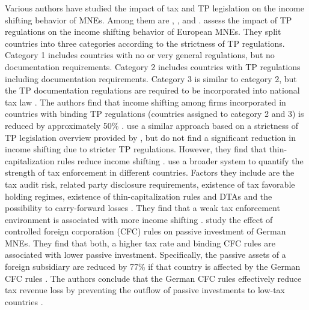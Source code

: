 \documentclass[10pt,twocolumn,oneside,cmyk]{article}
\begin{document}
Various authors have studied the impact of tax and TP legislation on the income shifting behavior of MNEs. Among them are \textcite{lohse_impact_2012}, \textcite{buettner_anti_2017}, \textcite{beuselinck_cross-jurisdictional_2015} and \textcite{ruf_taxation_2012}. \textcite{lohse_impact_2012} assess the impact of TP regulations on the income shifting behavior of European MNEs. They split countries into three categories according to the strictness of TP regulations. Category 1 includes countries with no or very general regulations, but no documentation requirements. Category 2 includes countries with TP regulations including documentation requirements. Category 3 is similar to category 2, but the TP documentation regulations are required to be incorporated into national tax law \parencite[6-7, 19-20]{lohse_impact_2012}. The authors find that income shifting among firms incorporated in countries with binding TP regulations (countries assigned to category 2 and 3) is reduced by approximately 50\% \parencite[10-11]{lohse_impact_2012}. \textcite{buettner_anti_2017} use a similar approach based on a strictness of TP legislation overview provided by \textcite[21-24]{lohse_increasing_2012}, but do not find a significant reduction in income shifting due to stricter TP regulations. However, they find that thin-capitalization rules reduce income shifting \parencite[13-14]{buettner_anti_2017}. \textcite{beuselinck_cross-jurisdictional_2015} use a broader system to quantify the strength of tax enforcement in different countries. Factors they include are the tax audit risk, related party disclosure requirements, existence of tax favorable holding regimes, existence of thin-capitalization rules and DTAs and the possibility to carry-forward losses \parencite[715-716]{beuselinck_cross-jurisdictional_2015}. They find that a weak tax enforcement environment is associated with more income shifting \parencite[729-732]{beuselinck_cross-jurisdictional_2015}. \textcite{ruf_taxation_2012} study the effect of controlled foreign corporation (CFC) rules on passive investment of German MNEs. They find that both, a higher tax rate and binding CFC rules are associated with lower passive investment. Specifically, the passive assets of a foreign subsidiary are reduced by 77\% if that country is affected by the German CFC rules \parencite[1513-1514]{ruf_taxation_2012}. The authors conclude that the German CFC rules effectively reduce tax revenue loss by preventing the outflow of passive investments to low-tax countries \parencite[1527]{ruf_taxation_2012}.
\end{document}
